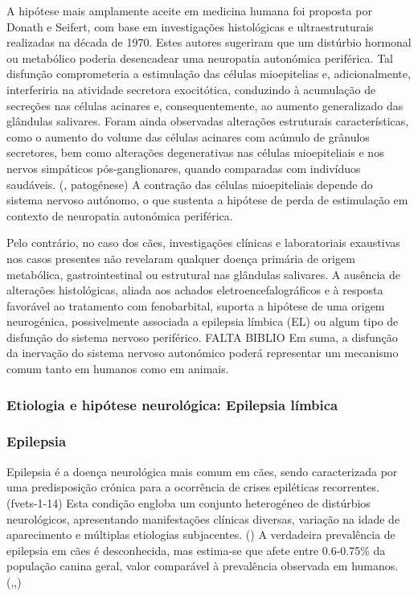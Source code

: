  A hipótese mais amplamente aceite em medicina humana foi proposta por Donath e Seifert, com base em investigações histológicas e ultraestruturais realizadas na década de 1970. Estes autores sugeriram que um distúrbio hormonal ou metabólico poderia desencadear uma neuropatia autonómica periférica. \cite{Davis2021} Tal disfunção comprometeria a estimulação das células mioepitelias e, adicionalmente, interferiria na atividade secretora exocitótica, conduzindo à acumulação de secreções nas células acinares e, consequentemente, ao aumento generalizado das glândulas salivares. \cite{Ihrler2010} Foram ainda observadas alterações estruturais características, como o aumento do volume das células acinares com acúmulo de grânulos secretores, bem como alterações degenerativas nas células mioepiteliais e nos nervos simpáticos pós-ganglionares, quando comparadas com indivíduos saudáveis. (\cite{Davis2021}, patogénese) A contração das células mioepiteliais depende do sistema nervoso autónomo, o que sustenta a hipótese de perda de estimulação em contexto de neuropatia autonómica periférica. \cite{Ihrler2010}


Pelo contrário, no caso dos cães, investigações clínicas e laboratoriais exaustivas nos casos presentes não revelaram qualquer doença primária de origem metabólica, gastrointestinal ou estrutural nas glândulas salivares. A ausência de alterações histológicas, aliada aos achados eletroencefalográficos e à resposta favorável ao tratamento com fenobarbital, suporta a hipótese de uma origem neurogénica, possivelmente associada a epilepsia límbica (EL) ou algum tipo de disfunção do sistema nervoso periférico. FALTA BIBLIO
Em suma, a disfunção da inervação do sistema nervoso autonómico poderá representar um mecanismo comum tanto em humanos como em animais. \cite{Alcoverro2014}


\subsubsection{Etiologia e hipótese neurológica: Epilepsia límbica}

\subsubsection{Epilepsia}

Epilepsia é a doença neurológica mais comum em cães, sendo caracterizada por uma predisposição crónica para a ocorrência de crises epiléticas recorrentes. (fvets-1-14) Esta condição engloba um conjunto heterogéneo de distúrbios neurológicos, apresentando manifestações clínicas diversas, variação na idade de aparecimento e múltiplas etiologias subjacentes. (\cite{fvets-09}) 
A verdadeira prevalência de epilepsia em cães é desconhecida, mas estima-se que afete entre 0.6-0.75\% da população canina geral, valor comparável à prevalência observada em humanos. (\cite{1-s2},\cite{Packer2015},\cite{fvets-09})


